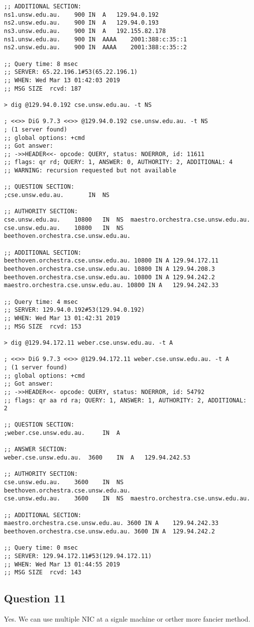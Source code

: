 \documentclass{article}
\begin{document}
\begin{lstlisting}
;; ADDITIONAL SECTION:
ns1.unsw.edu.au.	900	IN	A	129.94.0.192
ns2.unsw.edu.au.	900	IN	A	129.94.0.193
ns3.unsw.edu.au.	900	IN	A	192.155.82.178
ns1.unsw.edu.au.	900	IN	AAAA	2001:388:c:35::1
ns2.unsw.edu.au.	900	IN	AAAA	2001:388:c:35::2

;; Query time: 8 msec
;; SERVER: 65.22.196.1#53(65.22.196.1)
;; WHEN: Wed Mar 13 01:42:03 2019
;; MSG SIZE  rcvd: 187

> dig @129.94.0.192 cse.unsw.edu.au. -t NS

; <<>> DiG 9.7.3 <<>> @129.94.0.192 cse.unsw.edu.au. -t NS
; (1 server found)
;; global options: +cmd
;; Got answer:
;; ->>HEADER<<- opcode: QUERY, status: NOERROR, id: 11611
;; flags: qr rd; QUERY: 1, ANSWER: 0, AUTHORITY: 2, ADDITIONAL: 4
;; WARNING: recursion requested but not available

;; QUESTION SECTION:
;cse.unsw.edu.au.		IN	NS

;; AUTHORITY SECTION:
cse.unsw.edu.au.	10800	IN	NS	maestro.orchestra.cse.unsw.edu.au.
cse.unsw.edu.au.	10800	IN	NS	beethoven.orchestra.cse.unsw.edu.au.

;; ADDITIONAL SECTION:
beethoven.orchestra.cse.unsw.edu.au. 10800 IN A	129.94.172.11
beethoven.orchestra.cse.unsw.edu.au. 10800 IN A	129.94.208.3
beethoven.orchestra.cse.unsw.edu.au. 10800 IN A	129.94.242.2
maestro.orchestra.cse.unsw.edu.au. 10800 IN A	129.94.242.33

;; Query time: 4 msec
;; SERVER: 129.94.0.192#53(129.94.0.192)
;; WHEN: Wed Mar 13 01:42:31 2019
;; MSG SIZE  rcvd: 153

> dig @129.94.172.11 weber.cse.unsw.edu.au. -t A 

; <<>> DiG 9.7.3 <<>> @129.94.172.11 weber.cse.unsw.edu.au. -t A
; (1 server found)
;; global options: +cmd
;; Got answer:
;; ->>HEADER<<- opcode: QUERY, status: NOERROR, id: 54792
;; flags: qr aa rd ra; QUERY: 1, ANSWER: 1, AUTHORITY: 2, ADDITIONAL: 2

;; QUESTION SECTION:
;weber.cse.unsw.edu.au.		IN	A

;; ANSWER SECTION:
weber.cse.unsw.edu.au.	3600	IN	A	129.94.242.53

;; AUTHORITY SECTION:
cse.unsw.edu.au.	3600	IN	NS	beethoven.orchestra.cse.unsw.edu.au.
cse.unsw.edu.au.	3600	IN	NS	maestro.orchestra.cse.unsw.edu.au.

;; ADDITIONAL SECTION:
maestro.orchestra.cse.unsw.edu.au. 3600	IN A	129.94.242.33
beethoven.orchestra.cse.unsw.edu.au. 3600 IN A	129.94.242.2

;; Query time: 0 msec
;; SERVER: 129.94.172.11#53(129.94.172.11)
;; WHEN: Wed Mar 13 01:44:55 2019
;; MSG SIZE  rcvd: 143

\end{lstlisting}

\subsection{Question 11}

Yes. We can use multiple NIC at a signle machine or orther more fancier method.
\end{document}
